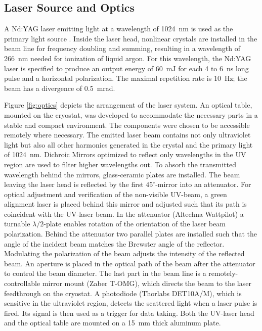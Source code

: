 \subsection{Laser Source and Optics}
A Nd:YAG laser emitting light at a wavelength of 1024~nm is used as the primary light source \cite{continuum}. Inside the laser head, nonlinear crystals are installed in the beam line for frequency doubling and summing, resulting in a wavelength of 266~nm needed for ionization of liquid argon. For this wavelength, the Nd:YAG laser is specified to produce an output energy of 60~mJ for each 4 to 6~ns long pulse and a horizontal polarization. The maximal repetition rate is 10~Hz; the beam has a divergence of 0.5~mrad.

Figure \ref{fig:optics} depicts the arrangement of the laser system.  An optical table, mounted on the cryostat, was developed to accommodate the necessary parts in a stable and compact environment. The components were chosen to be accessible remotely where necessary. The emitted laser beam contains not only ultraviolet light but also all other harmonics generated in the crystal and the primary light of 1024~nm. Dichroic Mirrors optimized to reflect only wavelengths in the UV region are used to filter higher wavelengths out. To absorb the transmitted wavelength behind the mirrors, glass-ceramic plates are installed. The beam leaving the laser head is reflected by the first $45^{\circ}$-mirror into an attenuator. For optical adjustment and verification of the non-visible UV-beam, a green alignment laser is placed behind this mirror and adjusted such that its path is coincident with the UV-laser beam. In the attenuator (Altechna Wattpilot) a turnable $\lambda/2$-plate enables rotation of the orientation of the laser beam polarization. Behind the attenuator two parallel plates are installed such that the angle of the incident beam matches the Brewster angle of the reflector. Modulating the polarization of the beam adjusts the intensity of the reflected beam. An aperture is placed in the optical path of the beam after the attenuator to control the beam diameter. The last part in the beam line is a remotely-controllable mirror mount (Zaber T-OMG), which directs the beam to the laser feedthrough on the cryostat. A photodiode (Thorlabs DET10A/M), which is sensitive in the ultraviolet region, detects the scattered light when a laser pulse is fired.  Its signal is then used as a trigger for data taking. Both the UV-laser head and the optical table are mounted on a 15~mm thick aluminum plate.

